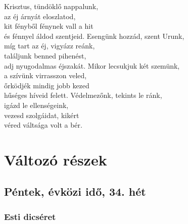 \documentclass[twoside]{article}
\begin{document}
\begin{hymnstanzas}
    Krisztus, tündöklő nappalunk,\\
    az éj árnyát eloszlatod,\\
    kit fényből fénynek vall a hit\\
    és fénnyel áldod szentjeid.
\stanzabreak
    Esengünk hozzád, szent Urunk, \\
    míg tart az éj, vigyázz reánk, \\
    találjunk benned pihenést, \\
    adj nyugodalmas éjszakát.
\stanzabreak
    Mikor lecsukjuk két szemünk, \\
    a szívünk virrasszon veled, \\
    őrködjék mindig jobb kezed \\
    hűséges híveid felett.
\stanzabreak
    Védelmezőnk, tekints le ránk, \\
    igázd le ellenségeink, \\
    vezesd szolgáidat, kikért \\
    véred váltsága volt a bér.
\end{hymnstanzas}

\label{Compl}

\section*{Változó részek}

\subsection*{Péntek, évközi idő, 34. hét}

\subsubsection*{Esti dicséret}
\end{document}

